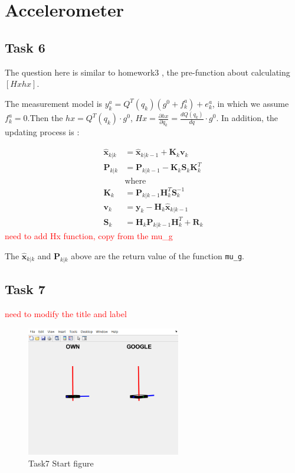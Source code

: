 \section{Accelerometer}

\subsection{Task 6}

The question here is similar to homework3 , the pre-function about calculating $ [Hx hx] $.

The measurement model is $ y_k^a=Q^T(q_k)(g^0+f_k^a)+e_k^a $, in which we assume $ f_k^a = 0 $.Then the $ hx = Q^T(q_k) \cdot g^0 $, $ Hx = \frac{\partial{hx}}{\partial{q_k}} = \frac{dQ(q_k)}{dq} \cdot g^0$. In addition, the updating process is :

\begin{equation}
    \begin{aligned}
        \hat{\textbf{x}}_{k|k}&=\hat{\textbf{x}}_{k|k-1}+\textbf{K}_k\textbf{v}_k\\
        \textbf{P}_{k|k}&=\textbf{P}_{k|k-1}-\textbf{K}_{k}\textbf{S}_{k}\textbf{K}_{k}^{T}\\
        &\text{where}\\
        \textbf{K}_k&=\textbf{P}_{k|k-1}\textbf{H}_k^T\textbf{S}_k^{-1}\\
        \textbf{v}_k&=\textbf{y}_k-\textbf{H}_k\hat{\textbf{x}}_{k|k-1}\\
        \textbf{S}_k&=\textbf{H}_k\textbf{P}_{k|k-1}\textbf{H}_k^T+\textbf{R}_k\nonumber
    \end{aligned}
\end{equation}
\textcolor{red}{need to add Hx function, copy from the mu\_g}

The $\hat{\textbf{x}}_{k|k}$ and $ \textbf{P}_{k|k}  $ above are the return value of the function \texttt{mu\_g}.

\subsection{Task 7}

\textcolor{red}{need to modify the title and label}
\begin{figure}[H]
 \centering
 \includegraphics[width=0.6\textwidth]{images/7start.png}
 \caption{Task7 Start figure}
 \label{7start}
\end{figure}

